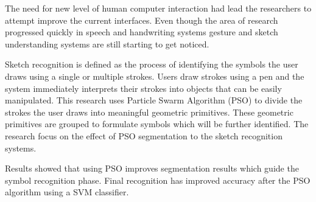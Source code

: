 \documentclass[11pt,doublespace]{Sketchthesis}
\begin{document}

\tableofcontents                                        %
\listoffigures                                          %


\begin{abstractpage}          



The need for new level of human computer interaction had lead the researchers to attempt improve the current interfaces. Even though the area of research progressed quickly in speech and handwriting systems gesture and sketch understanding systems are still starting to get noticed. 


Sketch recognition is defined as the process of identifying the symbols the user draws using a single or multiple strokes. Users draw strokes using a pen and the system immediately interprets their strokes into objects that can be easily manipulated. This research uses Particle Swarm Algorithm (PSO) to divide the strokes the user draws into meaningful geometric primitives. These geometric primitives are grouped to formulate symbols which will be further identified. The research focus on the effect of PSO segmentation to the sketch recognition systems. 

Results showed that using PSO improves segmentation results which guide the symbol recognition phase. Final recognition has improved accuracy after the PSO algorithm using a SVM classifier.  


\end{abstractpage}                              %
\end{document}
